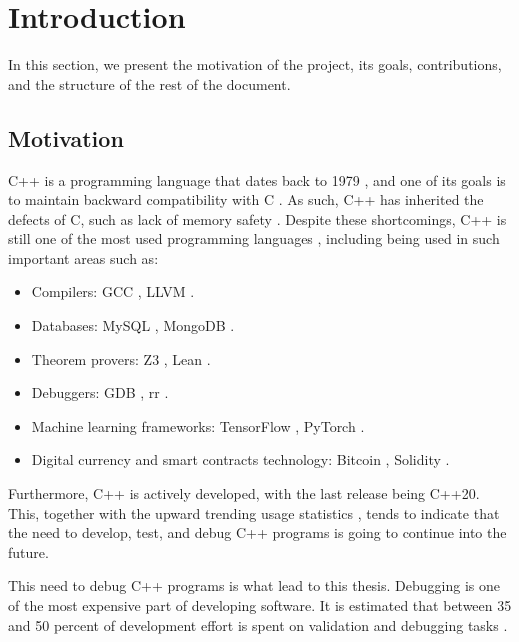 \chapter{Introduction}
\label{cap:introduccion}


In this section, we present the motivation of the project, its goals, contributions, and the structure of the rest of the document.

\section{Motivation}
C++ is a programming language that dates back to 1979 \cite{cppHistory}, and one of its goals is to maintain backward compatibility with C \cite{cCompat}. As such, C++ has inherited the defects of C, such as lack of memory safety \cite{practicalmemorysafety}.
Despite these shortcomings, C++ is still one of the most used programming languages \cite{popularityPL}, including being used in such important areas such as:
\begin{itemize}
    \item Compilers: GCC \cite{gcc}, LLVM \cite{llvm}.
    \item Databases: MySQL \cite{mysql}, MongoDB \cite{mongodb}.
    \item Theorem provers: Z3 \cite{z3}, Lean \cite{lean}.
    \item Debuggers: GDB \cite{gdb}, rr \cite{rr}.
    \item Machine learning frameworks: TensorFlow \cite{tensorflow}, PyTorch \cite{pytorch}.
    \item Digital currency and smart contracts technology: Bitcoin \cite{bitcoin}, Solidity \cite{solidity}.
\end{itemize}

Furthermore, C++ is actively developed, with the last release being C++20. This, together with the upward trending usage statistics \cite{popularityPL}, tends to indicate that the need to develop, test, and debug C++ programs is going to continue into the future.

This need to debug C++ programs is what lead to this thesis.
Debugging is one of the most expensive part of developing software.
It is estimated that between 35 and 50 percent of development effort is spent on validation and debugging tasks \cite{debuggingMindset}.

